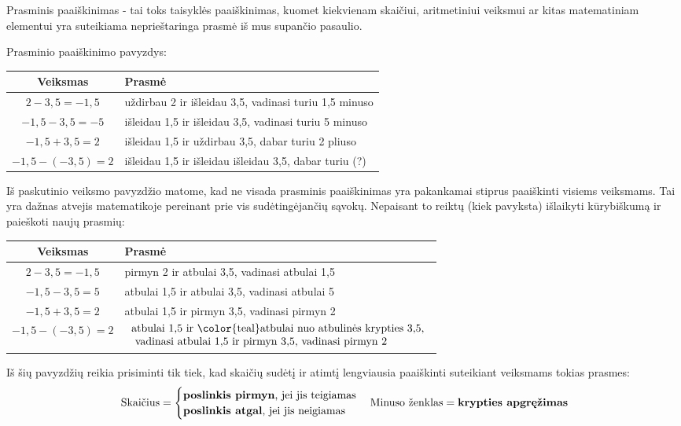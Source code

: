 \documentclass{article}
\begin{document}
\begin{mdframed}[backgroundcolor=yellow!50!white]
Prasminis paaiškinimas - tai toks taisyklės paaiškinimas, kuomet kiekvienam skaičiui, aritmetiniui veiksmui ar kitas matematiniam elementui yra suteikiama neprieštaringa prasmė iš mus supančio pasaulio.
\end{mdframed}

Prasminio paaiškinimo pavyzdys:

\begin{tabular}{|c|l|}
\hline
\textbf{Veiksmas} & \textbf{Prasmė} \\ \hline 
$2 - 3,5 = -1,5$ & uždirbau 2 ir išleidau 3,5, vadinasi turiu 1,5 minuso\\ \hline
$-1,5 - 3,5 = -5$ & išleidau 1,5 ir išleidau 3,5, vadinasi turiu 5 minuso\\ \hline
$-1,5 + 3,5 = 2$ & išleidau 1,5 ir uždirbau 3,5, dabar turiu 2 pliuso\\ \hline
$-1,5 -(- 3,5) = 2$ & išleidau 1,5 ir  {\color{red}išleidau išleidau} 3,5, dabar turiu (?) \\ \hline
\end{tabular}

Iš paskutinio veiksmo pavyzdžio matome, kad ne visada prasminis paaiškinimas yra pakankamai stiprus paaiškinti visiems veiksmams. Tai yra dažnas atvejis matematikoje pereinant prie vis sudėtingėjančių sąvokų. Nepaisant to reiktų (kiek pavyksta) išlaikyti kūrybiškumą ir paieškoti naujų prasmių:

 \begin{tabular}{|c|l|}
\hline
\textbf{Veiksmas} & \textbf{Prasmė} \\ \hline 
$2 - 3,5 = -1,5$ & pirmyn 2 ir atbulai 3,5, vadinasi atbulai 1,5\\ \hline
$-1,5 - 3,5 = 5$ & atbulai 1,5 ir atbulai 3,5, vadinasi atbulai 5 \\ \hline
$-1,5 + 3,5 = 2$ & atbulai 1,5 ir pirmyn 3,5, vadinasi pirmyn 2\\ \hline
$-1,5 -(- 3,5) = 2$ & $\begin{array}{ll}\text{atbulai 1,5 ir  {\color{teal}atbulai nuo atbulinės krypties 3,5,}}\\ \text{ vadinasi atbulai 1,5 ir pirmyn 3,5, vadinasi pirmyn 2} \end{array}$ \\ \hline
\end{tabular}

Iš šių pavyzdžių reikia prisiminti tik tiek, kad skaičių sudėtį ir atimtį lengviausia paaiškinti suteikiant veiksmams tokias prasmes: 
$$\text{Skaičius} = \begin{cases} \text{\textbf{poslinkis pirmyn}, jei jis teigiamas} \\ \text{\textbf{poslinkis atgal}, jei jis neigiamas}\end{cases} \text{Minuso ženklas} = \text{\textbf{krypties apgręžimas}}$$
\end{document}
